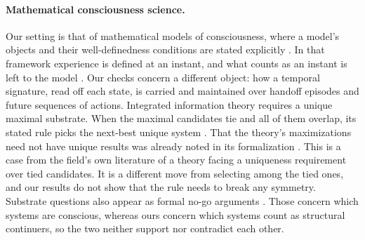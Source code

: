 \paragraph{Mathematical consciousness science.}
Our setting is that of mathematical models of consciousness, where a model's
objects and their well-definedness conditions are stated explicitly
\citep{Kleiner2020MathematicalModels}. In that framework experience is
defined at an instant, and what counts as an instant is left to the model
\citep[Definition~2]{Kleiner2020MathematicalModels}. Our checks concern a
different object: how a temporal signature, read off each state, is carried
and maintained over handoff episodes and future sequences of actions. Integrated information theory
requires a unique maximal substrate. When the maximal candidates tie and all
of them overlap, its stated rule picks the next-best unique system
\citep{AlbantakisEtAl2023IIT4}. That the theory's maximizations need not have
unique results was already noted in its formalization
\citep[Section~12.2]{KleinerTull2021}. This is a
case from the field's own literature of a theory facing a uniqueness
requirement over tied candidates. It is a different move from selecting among
the tied ones, and our results do not show that the rule needs to break any
symmetry. Substrate questions also appear as formal no-go arguments
\citep{KleinerLudwig2024Neurons}. Those concern which systems are conscious,
whereas ours concern which systems count as structural continuers, so the two
neither support nor contradict each other.

